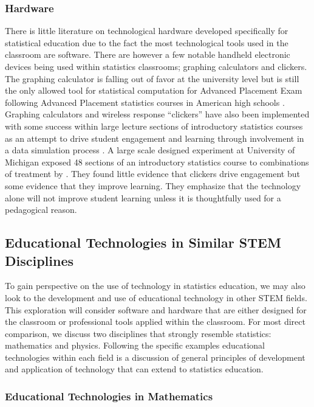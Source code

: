 \documentclass[11pt]{isuthesis}
\begin{document}
\subsubsection{Hardware} 

There is little literature on technological hardware developed specifically for statistical education due to the fact the most technological tools used in the classroom are software. There are however a few notable handheld electronic devices being used within statistics classrooms; graphing calculators and clickers. The graphing calculator is falling out of favor at the university level but is still the only allowed tool for statistical computation for Advanced Placement Exam following Advanced Placement statistics courses in American high schools \citep{APcalculator}. Graphing calculators and wireless response ``clickers'' have also been implemented with some success within large lecture sections of introductory statistics courses as an attempt to drive student engagement and learning through involvement in a data simulation process \citep{Kaplan2011}.  A large scale designed experiment at University of Michigan exposed 48 sections of an introductory statistics course to combinations of treatment by \citet{McGowanGunderson2010}. They found little evidence that clickers drive engagement but some evidence that they improve learning. They emphasize that the technology alone will not improve student learning unless it is thoughtfully used for a pedagogical reason.

\subsection{Educational Technologies in Similar STEM Disciplines}
\label{EdTechSTEM}

To gain perspective on the use of technology in statistics education, we may also look to the development and use of educational technology in other STEM fields. This exploration will consider software and hardware that are either designed for the classroom or professional tools applied within the classroom. For most direct comparison, we discuss two disciplines that strongly resemble statistics: mathematics and physics. Following the specific examples educational technologies within each field is a discussion of general principles of development and application of technology that can extend to statistics education. 

\subsubsection{Educational Technologies in Mathematics}
\label{EdTechMath}
\end{document}
